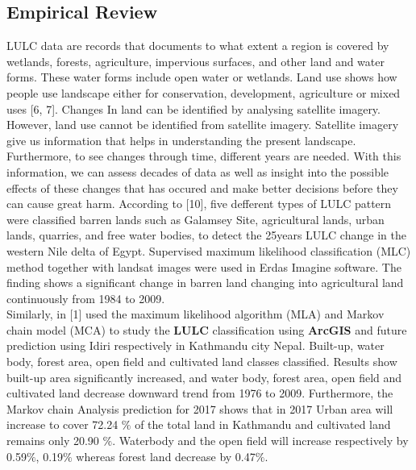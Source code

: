 \documentclass[10pt]{report}
\begin{document}
\begin{flushleft}
		\subsection{Empirical Review}
		LULC data are records that documents to what extent a region is covered by wetlands, forests, agriculture, impervious surfaces, and 	other land and water forms. These water forms include open water  or wetlands. Land use shows how people use landscape either for conservation, development, agriculture or mixed uses [6, 7]. Changes In land can be identified by analysing satellite imagery. However, land use cannot be identified from satellite imagery. Satellite imagery give us  information that helps in understanding the present landscape. Furthermore, to see changes	through time, different years are needed. With this information, we can assess  decades of data as well as  insight into the possible effects of these changes that has occured and make better decisions before they can cause great harm.	According to [10], five defferent types of LULC pattern were classified barren lands such as Galamsey Site, agricultural lands, urban lands, quarries, and free water bodies, to detect the 25years LULC change in the western Nile delta of Egypt. Supervised maximum likelihood classification (MLC)	method together with landsat images were used in Erdas Imagine software. The finding shows a significant
		change in barren land changing into agricultural land continuously	from 1984 to 2009.\\
		
		Similarly, in [1] used the maximum likelihood algorithm (MLA) and Markov chain model (MCA) to study the \textbf{LULC} classification using \textbf{ArcGIS} and future prediction using Idiri respectively in	Kathmandu city Nepal. Built-up, water body, forest area, open field and cultivated land classes classified. Results show built-up area significantly increased, and water body, forest area, open	field and cultivated land decrease downward trend from 1976 to 2009. Furthermore, the Markov chain Analysis prediction for 2017	shows that in 2017 Urban area will increase to cover 72.24 $\%$ of	the total land in Kathmandu and cultivated land remains only	20.90 $\%$. Waterbody and the open field will increase respectively	by 0.59$\%$, 0.19$\%$ whereas forest land decrease by 0.47$\%$. \\
		

\end{flushleft}
\end{document}
